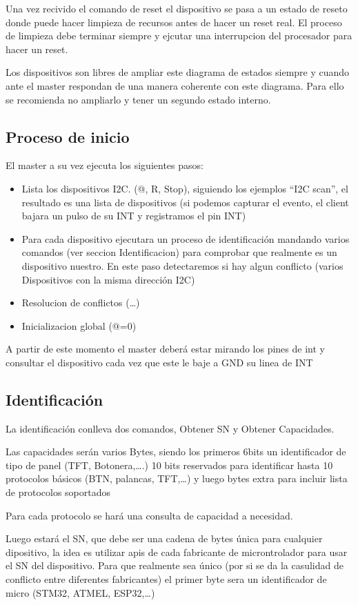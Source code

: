 Una vez recivido el comando de reset el dispositivo se pasa a un estado de reseto donde puede hacer limpieza
de recursos antes de hacer un reset real. El proceso de limpieza debe terminar siempre y ejcutar una
interrupcion del procesador para hacer un reset.

Los dispositivos son libres de ampliar este diagrama de estados siempre y cuando ante el master respondan de
una manera coherente con este diagrama. Para ello se recomienda no ampliarlo y tener un segundo estado interno.

\subsection{Proceso de inicio}
El master a su vez ejecuta los siguientes pasos:
\begin{itemize}
    \item{} Lista los dispositivos I2C. (@, R, Stop), siguiendo los ejemplos “I2C scan”, el resultado es una lista
          de dispositivos (si podemos capturar el evento, el client bajara un pulso de su INT y registramos el pin INT)
    \item{} Para cada dispositivo ejecutara un proceso de identificación mandando varios comandos (ver seccion
          Identificacion) para comprobar que realmente es un dispositivo nuestro. En este
          paso detectaremos si hay algun conflicto (varios Dispositivos con la misma dirección I2C)
    \item{} Resolucion de conflictos (…)
    \item{} Inicializacion global (@=0)
\end{itemize}
A partir de este momento el master deberá estar mirando los pines de int y consultar el dispositivo cada vez que
este le baje a GND su linea de INT

\subsection{Identificación}
La identificación conlleva dos comandos, Obtener SN y Obtener Capacidades.

Las capacidades serán varios Bytes, siendo los primeros 6bits un identificador de tipo de panel (TFT, Botonera,….) 10 bits reservados para identificar hasta 10 protocolos básicos
(BTN, palancas, TFT,…) y luego bytes extra para incluir lista de protocolos soportados

Para cada protocolo se hará una consulta de capacidad a necesidad.

Luego estará el SN, que debe ser una cadena de bytes única para cualquier dipositivo, la idea es utilizar apis
de cada fabricante de microntrolador para usar el SN del dispositivo. Para que realmente sea único (por si
se da la casulidad de conflicto entre diferentes fabricantes) el primer byte sera un identificador de micro
(STM32, ATMEL, ESP32,…)
